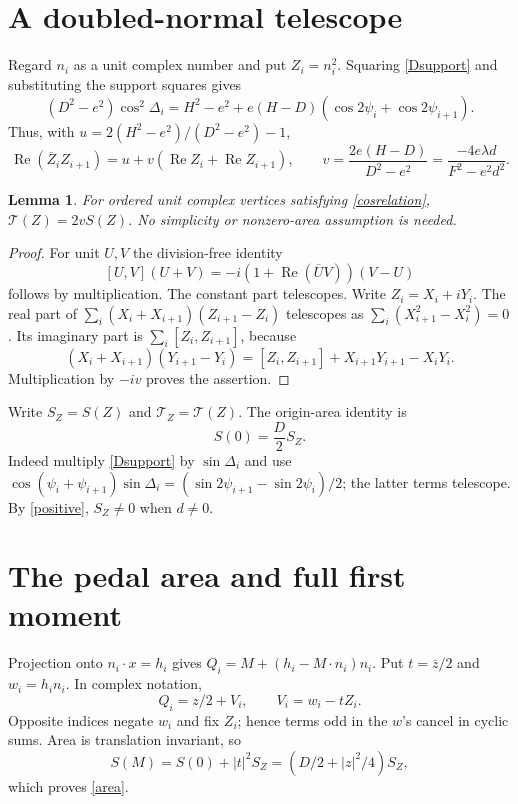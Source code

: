 \documentclass[11pt]{article}
\newtheorem{lemma}{Lemma}
\newcommand{\Rea}{\operatorname{Re}}
\newcommand{\cross}[2]{[#1,#2]}
\begin{document}
\section{A doubled-normal telescope}
Regard $n_i$ as a unit complex number and put $Z_i=n_i^2$.
Squaring \eqref{Dsupport} and substituting the support squares gives
\[
 (D^2-e^2)\cos^2\Delta_i
 =H^2-e^2+e(H-D)(\cos2\psi_i+\cos2\psi_{i+1}).
\]
Thus, with $u=2(H^2-e^2)/(D^2-e^2)-1$,
\begin{equation}\label{cosrelation}
 \Rea(\overline Z_iZ_{i+1})=u+v(\Rea Z_i+\Rea Z_{i+1}),\qquad
 v=\frac{2e(H-D)}{D^2-e^2}=\frac{-4e\lambda d}{F^2-e^2d^2}.
\end{equation}
\begin{lemma}\label{cyclic}
For ordered unit complex vertices satisfying \eqref{cosrelation},
$\mathcal T(Z)=2vS(Z)$. No simplicity or nonzero-area assumption is needed.
\end{lemma}
\begin{proof}
For unit $U,V$ the division-free identity
\[
 \cross{U}{V}(U+V)=-i(1+\Rea(\overline U V))(V-U)
\]
follows by multiplication. The constant part telescopes. Write
$Z_i=X_i+iY_i$. The real part of
$\sum_i(X_i+X_{i+1})(Z_{i+1}-Z_i)$ telescopes as
$\sum_i(X_{i+1}^2-X_i^2)=0$. Its imaginary part is
$\sum_i\cross{Z_i}{Z_{i+1}}$, because
\[
 (X_i+X_{i+1})(Y_{i+1}-Y_i)
 =\cross{Z_i}{Z_{i+1}}+X_{i+1}Y_{i+1}-X_iY_i.
\]
Multiplication by $-iv$ proves the assertion.
\end{proof}
Write $S_Z=S(Z)$ and $\mathcal T_Z=\mathcal T(Z)$.
The origin-area identity is
\begin{equation}\label{origin}
 S(0)=\frac D2 S_Z.
\end{equation}
Indeed multiply \eqref{Dsupport} by $\sin\Delta_i$ and use
$\cos(\psi_i+\psi_{i+1})\sin\Delta_i
=(\sin2\psi_{i+1}-\sin2\psi_i)/2$; the latter terms telescope.
By \eqref{positive}, $S_Z\ne0$ when $d\ne0$.

\section{The pedal area and full first moment}
Projection onto $n_i\cdot x=h_i$ gives
$Q_i=M+(h_i-M\cdot n_i)n_i$. Put $t=\overline z/2$ and $w_i=h_i n_i$.
In complex notation,
\begin{equation}\label{projection}
 Q_i=z/2+V_i,\qquad V_i=w_i-tZ_i.
\end{equation}
Opposite indices negate $w_i$ and fix $Z_i$; hence terms odd in the $w$'s
cancel in cyclic sums. Area is translation invariant, so
\begin{equation}\label{pedalarea}
 S(M)=S(0)+|t|^2S_Z=(D/2+|z|^2/4)S_Z,
\end{equation}
which proves \eqref{area}.
\end{document}
